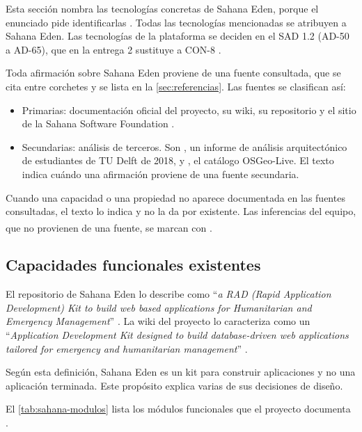 \documentclass[11pt,letterpaper]{article}
\newcommand{\inferencia}{\textsuperscript{\textasteriskcentered}}
\begin{document}
Esta sección nombra las tecnologías concretas de Sahana Eden, porque el enunciado pide
identificarlas \cite{enunciado}. Todas las tecnologías mencionadas se atribuyen a Sahana Eden.
Las tecnologías de la plataforma se deciden en el SAD 1.2 (AD-50 a AD-65), que en la entrega 2
sustituye a CON-8 \cite{sad}.

Toda afirmación sobre Sahana Eden proviene de una fuente consultada, que se cita entre corchetes y
se lista en la \cref{sec:referencias}. Las fuentes se clasifican así:

\begin{itemize}
  \item Primarias: documentación oficial del proyecto, su wiki, su repositorio y el sitio de la
        Sahana Software Foundation \cite{sahana-eden-legacy,eden-basics,eden-asp,eden-repo,
        eden-license,eden-xslt,eden-wiki,sambro}.
  \item Secundarias: análisis de terceros. Son \cite{desosa2018}, un informe de análisis
        arquitectónico de estudiantes de TU Delft de 2018, y \cite{osgeo}, el catálogo OSGeo-Live.
        El texto indica cuándo una afirmación proviene de una fuente secundaria.
\end{itemize}

Cuando una capacidad o una propiedad no aparece documentada en las fuentes consultadas, el texto lo
indica y no la da por existente. Las inferencias del equipo, que no provienen de una fuente, se
marcan con \inferencia{}.

\subsection{Capacidades funcionales existentes}

El repositorio de Sahana Eden lo describe como \enquote{\emph{a RAD (Rapid Application Development)
Kit to build web based applications for Humanitarian and Emergency Management}} \cite{eden-repo}. La
wiki del proyecto lo caracteriza como un \enquote{\emph{Application Development Kit designed to
build database-driven web applications tailored for emergency and humanitarian management}}
\cite{eden-wiki}.

Según esta definición, Sahana Eden es un kit para construir aplicaciones y no una aplicación
terminada. Este propósito explica varias de sus decisiones de diseño.

El \cref{tab:sahana-modulos} lista los módulos funcionales que el proyecto documenta
\cite{sahana-eden-legacy}.
\end{document}
